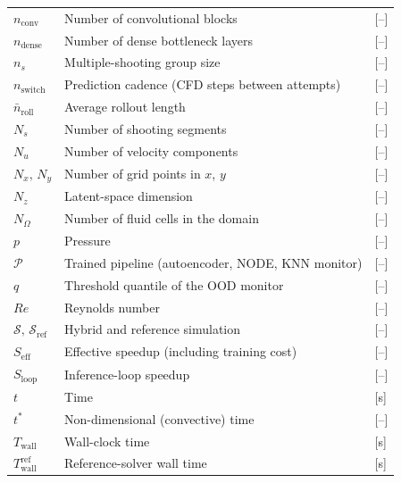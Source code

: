 \begin{longtable}{p{2.5cm}p{9cm}p{2.5cm}}
    $n_\text{conv}$      & Number of convolutional blocks                   & [--] \\
    $n_\text{dense}$     & Number of dense bottleneck layers                & [--] \\
    $n_s$                & Multiple-shooting group size                     & [--] \\
    $n_\text{switch}$    & Prediction cadence (CFD steps between attempts)  & [--] \\
    $\bar{n}_\text{roll}$ & Average rollout length                          & [--] \\
    $N_s$                & Number of shooting segments                      & [--] \\
    $N_u$                & Number of velocity components                    & [--] \\
    $N_x,\,N_y$          & Number of grid points in $x$, $y$                & [--] \\
    $N_z$                & Latent-space dimension                           & [--] \\
    $N_\Omega$           & Number of fluid cells in the domain              & [--] \\
    $p$                  & Pressure                                         & [--] \\
    $\mathcal{P}$        & Trained pipeline (autoencoder, NODE, KNN monitor) & [--] \\
    $q$                  & Threshold quantile of the OOD monitor            & [--] \\
    $Re$                 & Reynolds number                                  & [--] \\
    $\mathcal{S},\,\mathcal{S}_\text{ref}$ & Hybrid and reference simulation & [--] \\
    $S_\text{eff}$       & Effective speedup (including training cost)      & [--] \\
    $S_\text{loop}$      & Inference-loop speedup                           & [--] \\
    $t$                  & Time                                             & [s] \\
    $t^*$                & Non-dimensional (convective) time                & [--] \\
    $T_\text{wall}$      & Wall-clock time                                  & [s] \\
    $T_\text{wall}^\text{ref}$ & Reference-solver wall time                 & [s] \\

\end{longtable}
